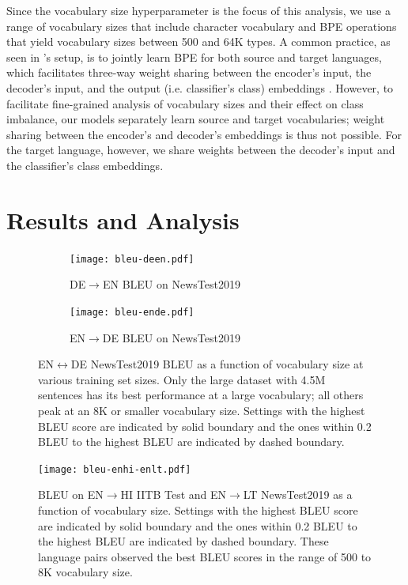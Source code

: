 Since the vocabulary size hyperparameter is the focus of this analysis, we use a range of vocabulary sizes that include character vocabulary and BPE operations that yield vocabulary sizes between 500 and 64K types.
A common practice, as seen in 's setup, is to jointly learn BPE for both source and target languages, which facilitates three-way weight sharing between the encoder's input, the decoder's input, and the output (i.e. classifier's class) embeddings \cite{press-wolf-2017-using}.
However, to facilitate fine-grained analysis of vocabulary sizes and their effect on class imbalance, our models separately learn source and target vocabularies; weight sharing between the encoder's and decoder's embeddings is thus not possible.
For the target language, however, we share weights between the decoder's input and the classifier's class embeddings.

\section{Results and Analysis}
\label{sec:nmt_analysis}
\begin{figure}[ht]
\begin{subfigure}{0.70\linewidth}
    \centering
    \texttt{[image: bleu-deen.pdf]}
    \caption{DE$\rightarrow$EN BLEU on NewsTest2019}
    \label{fig:bleu-deen}
\end{subfigure}
\begin{subfigure}{0.70\linewidth}
    \centering
    \texttt{[image: bleu-ende.pdf]}
    \caption{EN$\rightarrow$DE BLEU on NewsTest2019}
    \label{fig:bleu-ende}
\end{subfigure}
\caption{EN$\leftrightarrow$DE NewsTest2019 BLEU as a function of vocabulary size at various training set sizes. 
Only the large dataset with 4.5M sentences has its best performance at a large vocabulary; all others peak at an 8K or smaller vocabulary size. Settings with the highest BLEU score are indicated by solid boundary and the ones within 0.2 BLEU to the highest BLEU are indicated by dashed boundary.}
\label{fig:bleu-ende-deen}
\end{figure}

\begin{figure}[ht]
    \centering
    \texttt{[image: bleu-enhi-enlt.pdf]}
    \caption{BLEU on EN$\rightarrow$HI IITB Test and EN$\rightarrow$LT NewsTest2019 as a function of vocabulary size.  Settings with the highest BLEU score are indicated by solid boundary and the ones within 0.2 BLEU to the highest BLEU are indicated by dashed boundary.
    These language pairs observed the best BLEU scores in the range of 500 to 8K vocabulary size.   }
    \label{fig:bleu-enhilt}
\end{figure}


